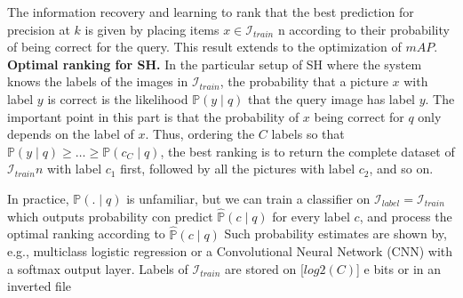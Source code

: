 \documentclass{article}
\begin{document}
The information recovery \cite{doi:10.1108/eb026647} and learning to rank that the best prediction for precision at $k$ is given by placing items $x \in \mathcal{I}_{train}$ n according to their probability of being correct for the query. This result extends to the optimization of $mAP$.
\\
\textbf{Optimal ranking for SH.} In the particular setup of SH where the system knows the labels of the images in $\mathcal{I}_{train}$, the probability that a picture $x$ with label $y$ is correct is the likelihood $\mathbb{P}(y\mid q)$ that the query image has label $y$. The important point in this part is that the probability of $x$ being correct for $q$ only depends on the label of $x$. Thus, ordering the $C$ labels so that $\mathbb{P}(y\mid q)\geq \dots \geq\mathbb{P}(c_C\mid q)$, the best ranking is to return the complete dataset of $\mathcal{I}_{train}n$ with label $c_1$ first, followed by all the pictures with label $c_2$, and so on.
\\

In practice, $\mathbb{P}(.\mid q)$ is unfamiliar, but we can train a classifier on $\mathcal{I}_{label} = \mathcal{I}_{train}$ which outputs probability con predict $\hat{\mathbb{P}}(c\mid q)$ for every label $c$, and process the optimal ranking according to $\hat{\mathbb{P}}(c\mid q)$ Such probability estimates are shown by, e.g., multiclass logistic regression or a Convolutional Neural
Network (CNN) with a softmax output layer. Labels of $ \mathcal{I}_{train}$
are stored on [$log2 (C)$] e bits or in an inverted file
\end{document}
